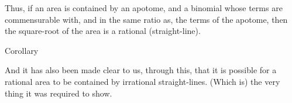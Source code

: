 \begin{Parallel}{}{}
{Thus, if an area is contained by an apotome, and
a binomial whose terms are commensurable with, and in the same ratio as, the 
terms of the apotome, then the square-root of the area is a rational (straight-line).\\

\begin{center}
{\large Corollary}
\end{center}\vspace*{-7pt}

And it has also been made clear to us,  through this,  that it is
possible for  a rational
area to be contained by irrational straight-lines. (Which is) the very thing it was required to show.}
\end{Parallel}

